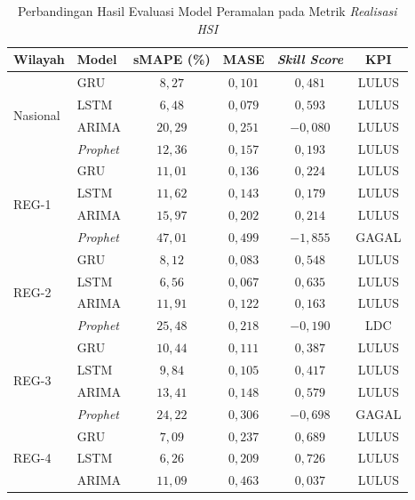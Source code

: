 \begin{table}[htbp]
\centering
\caption{Perbandingan Hasil Evaluasi Model Peramalan pada Metrik \textit{Realisasi HSI}}
\label{tab:hasil-forecasting-realisasi}
\begin{tabular}{|p{2.2cm}|p{1.5cm}|c|c|c|c|}
\hline
\textbf{Wilayah} & \textbf{Model} & \textbf{sMAPE (\%)} & \textbf{MASE} & \textbf{\textit{Skill Score}} & \textbf{KPI} \\
\hline
\multirow{4}{*}{Nasional} & GRU & $8{,}27$ & $0{,}101$ & $0{,}481$ & LULUS \\
\cline{2-6}
 & LSTM & $6{,}48$ & $0{,}079$ & $0{,}593$ & LULUS \\
\cline{2-6}
 & ARIMA & $20{,}29$ & $0{,}251$ & $-0{,}080$ & LULUS \\
\cline{2-6}
 & \textit{Prophet} & $12{,}36$ & $0{,}157$ & $0{,}193$ & LULUS \\
\hline
\multirow{4}{*}{REG-1} & GRU & $11{,}01$ & $0{,}136$ & $0{,}224$ & LULUS \\
\cline{2-6}
 & LSTM & $11{,}62$ & $0{,}143$ & $0{,}179$ & LULUS \\
\cline{2-6}
 & ARIMA & $15{,}97$ & $0{,}202$ & $0{,}214$ & LULUS \\
\cline{2-6}
 & \textit{Prophet} & $47{,}01$ & $0{,}499$ & $-1{,}855$ & GAGAL \\
\hline
\multirow{4}{*}{REG-2} & GRU & $8{,}12$ & $0{,}083$ & $0{,}548$ & LULUS \\
\cline{2-6}
 & LSTM & $6{,}56$ & $0{,}067$ & $0{,}635$ & LULUS \\
\cline{2-6}
 & ARIMA & $11{,}91$ & $0{,}122$ & $0{,}163$ & LULUS \\
\cline{2-6}
 & \textit{Prophet} & $25{,}48$ & $0{,}218$ & $-0{,}190$ & LDC \\
\hline
\multirow{4}{*}{REG-3} & GRU & $10{,}44$ & $0{,}111$ & $0{,}387$ & LULUS \\
\cline{2-6}
 & LSTM & $9{,}84$ & $0{,}105$ & $0{,}417$ & LULUS \\
\cline{2-6}
 & ARIMA & $13{,}41$ & $0{,}148$ & $0{,}579$ & LULUS \\
\cline{2-6}
 & \textit{Prophet} & $24{,}22$ & $0{,}306$ & $-0{,}698$ & GAGAL \\
\hline
\multirow{4}{*}{REG-4} & GRU & $7{,}09$ & $0{,}237$ & $0{,}689$ & LULUS \\
\cline{2-6}
 & LSTM & $6{,}26$ & $0{,}209$ & $0{,}726$ & LULUS \\
\cline{2-6}
 & ARIMA & $11{,}09$ & $0{,}463$ & $0{,}037$ & LULUS \\

\end{tabular}
\end{table}
